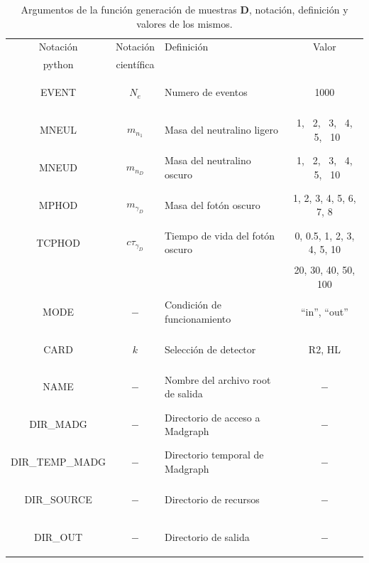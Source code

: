 \begin{table}[!ht]
\begin{center}
\small
\begin{tabular}{|cclc|}
\toprule
Notación  & Notación  & Definición & Valor\\
python & científica  & & \\
\midrule
\begin{scriptsize}EVENT\end{scriptsize} & $N_e$ & Numero de eventos & 1000\\
\begin{scriptsize}MNEUL\end{scriptsize} & $m_{n_1}$ & Masa del neutralino ligero & 1, ~2, ~3, ~4, ~5, ~10\\
\begin{scriptsize}MNEUD\end{scriptsize} & $m_{n_D}$ & Masa del neutralino oscuro & 1, ~2, ~3, ~4, ~5, ~10\\
\begin{scriptsize}MPHOD\end{scriptsize} & $m_{\gamma_D}$ & Masa del fotón oscuro & 1, 2, 3, 4, 5, 6, 7, 8\\
\begin{scriptsize}TCPHOD\end{scriptsize} & $c\tau_{\gamma_D}$ & Tiempo de vida del fotón oscuro &0, 0.5, 1, 2, 3, 4, 5, 10\\
& & &20, 30, 40, 50, 100\\
\begin{scriptsize}MODE\end{scriptsize} & $-$ & Condición de funcionamiento & ``in'', ``out''\\
\begin{scriptsize}CARD\end{scriptsize} & $k$ & Selección de detector & R2, HL \\
\begin{scriptsize}NAME\end{scriptsize} & $-$ & Nombre del archivo root de salida & $-$\\
\begin{scriptsize}DIR\_MADG\end{scriptsize} & $-$ & Directorio de acceso a Madgraph & $-$\\
\begin{scriptsize}DIR\_TEMP\_MADG\end{scriptsize} & $-$ & Directorio temporal de Madgraph & $-$\\
\begin{scriptsize}DIR\_SOURCE\end{scriptsize} & $-$ & Directorio de recursos & $-$ \\
\begin{scriptsize}DIR\_OUT\end{scriptsize} & $-$ & Directorio de salida & $-$\\
\hline
\end{tabular}
\caption{Argumentos de la función generación de muestras \MSSM\textbf{D}, notación, definición y valores de los mismos.}
\label{table_genera_v5_value}
\end{center}
\end{table}
